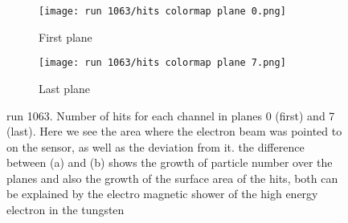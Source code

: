 \documentclass[11pt]{article}
\begin{document}






\begin{figure}[h!]
    \centering
    \begin{subfigure}{0.49\textwidth}
        \texttt{[image: run 1063/hits colormap plane 0.png]}
        \caption{First plane}
    \end{subfigure}
    \hfill
    \begin{subfigure}{0.49\textwidth}
        \texttt{[image: run 1063/hits colormap plane 7.png]}
        \caption{Last plane}
    \end{subfigure}
    \caption{run 1063. Number of hits for each channel in planes 0 (first) and 7 (last). Here we see the area where the electron beam was pointed to on the sensor, as well as the deviation from it. the difference between (a) and (b) shows the growth of particle number over the planes and also the growth of the surface area of the hits, both can be explained by the electro magnetic shower of the high energy electron in the tungsten}
    \label{hit amount colormap}
\end{figure}
\end{document}
